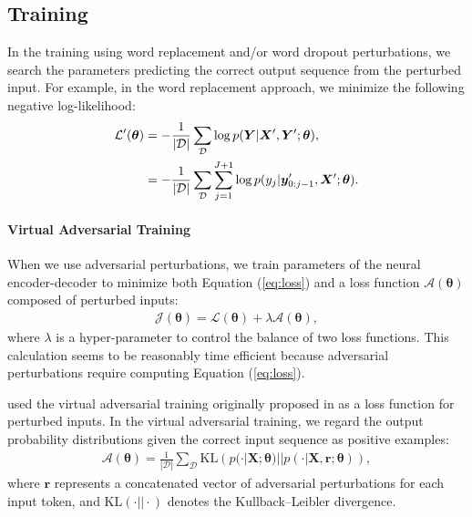 \documentclass[11pt]{article}
\begin{document}
\subsection{Training}
In the training using word replacement and/or word dropout perturbations, we search the parameters predicting the correct output sequence from the perturbed input.
For example, in the word replacement approach, we minimize the following negative log-likelihood:
\begin{align}
 \label{eq:loss_with_perturbation}
  \mathcal{L}'(\bm{\theta}) &= -\frac{1}{|\mathcal{D}|} \sum_{\mathcal{D}} \log p(\bm{Y}|\bm{X}', \bm{Y}'; \bm{\theta}), \notag \\
   &= -\frac{1}{|\mathcal{D}|} \sum_{\mathcal{D}} \sum_{j=1}^{J+1} \log p(y_j | \bm{y}'_{0:j-1}, \bm{X}'; \bm{\theta}).
\end{align}

\paragraph{Virtual Adversarial Training}
When we use adversarial perturbations, we train parameters of the neural encoder-decoder to minimize both Equation (\ref{eq:loss}) and a loss function $\mathcal{A}(\bm{\theta})$ composed of perturbed inputs:
\begin{align}
 \mathcal{J}(\bm{\theta}) = \mathcal{L}(\bm{\theta}) + \lambda \mathcal{A}(\bm{\theta}),
\end{align}
where $\lambda$ is a hyper-parameter to control the balance of two loss functions.
This calculation seems to be reasonably time efficient because adversarial perturbations require computing Equation (\ref{eq:loss}).

 used the virtual adversarial training originally proposed in  as a loss function for perturbed inputs.
In the virtual adversarial training, we regard the output probability distributions given the correct input sequence as positive examples:
\begin{align}
 \mathcal{A}(\bm{\theta}) = \frac{1}{|\mathcal{D}|} \sum_\mathcal{D} \mathrm{KL}\left( p(\cdot | \bm{X}; \bm{\theta}) || p(\cdot | \bm{X}, \bm{r}; \bm{\theta}) \right),
\end{align}
where $\bm{r}$ represents a concatenated vector of adversarial perturbations for each input token, and $\mathrm{KL}(\cdot || \cdot)$ denotes the Kullback–Leibler divergence.
\end{document}
